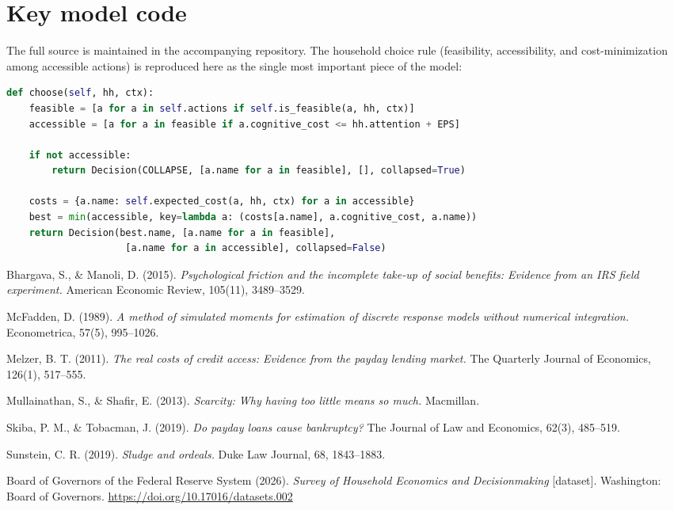 \documentclass[12pt]{article}
\begin{document}
\section{Key model code}

The full source is maintained in the accompanying repository. The household choice rule (feasibility, accessibility, and cost-minimization among accessible actions) is reproduced here as the single most important piece of the model:

\begin{lstlisting}[language=Python]
def choose(self, hh, ctx):
    feasible = [a for a in self.actions if self.is_feasible(a, hh, ctx)]
    accessible = [a for a in feasible if a.cognitive_cost <= hh.attention + EPS]

    if not accessible:
        return Decision(COLLAPSE, [a.name for a in feasible], [], collapsed=True)

    costs = {a.name: self.expected_cost(a, hh, ctx) for a in accessible}
    best = min(accessible, key=lambda a: (costs[a.name], a.cognitive_cost, a.name))
    return Decision(best.name, [a.name for a in feasible],
                     [a.name for a in accessible], collapsed=False)
\end{lstlisting}

\begin{thebibliography}{9}

Bhargava, S., \& Manoli, D. (2015).
\textit{Psychological friction and the incomplete take-up of social benefits: Evidence from an IRS field experiment.}
American Economic Review, 105(11), 3489--3529.

McFadden, D. (1989).
\textit{A method of simulated moments for estimation of discrete response models without numerical integration.}
Econometrica, 57(5), 995--1026.

Melzer, B. T. (2011).
\textit{The real costs of credit access: Evidence from the payday lending market.}
The Quarterly Journal of Economics, 126(1), 517--555.

Mullainathan, S., \& Shafir, E. (2013).
\textit{Scarcity: Why having too little means so much.}
Macmillan.

Skiba, P. M., \& Tobacman, J. (2019).
\textit{Do payday loans cause bankruptcy?}
The Journal of Law and Economics, 62(3), 485--519.

Sunstein, C. R. (2019).
\textit{Sludge and ordeals.}
Duke Law Journal, 68, 1843--1883.

Board of Governors of the Federal Reserve System (2026).
\textit{Survey of Household Economics and Decisionmaking} [dataset].
Washington: Board of Governors. \url{https://doi.org/10.17016/datasets.002}

\end{thebibliography}
\end{document}
